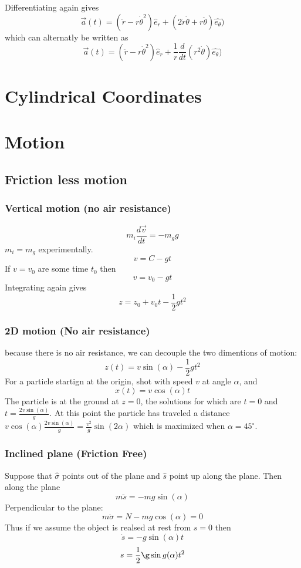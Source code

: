 \documentclass{homework}
\begin{document}
Differentiating again gives 
\[\vec{a}(t) = (\ddot{r} - r\dot{\theta}^2)\hat e_r + (2\dot{r}\dot{\theta} + r\ddot{\theta})\hat{e_{\theta}})\]
which can alternatly be written as
\[\vec{a}(t) = (\ddot{r} - r\dot{\theta}^2)\hat e_r + \frac{1}{r}\frac{d}{dt}(r^2\dot{\theta})\hat{e_{\theta}})\]


\section{Cylindrical Coordinates}

\section{Motion}

\subsection{Friction less motion}

\subsubsection{Vertical motion (no air resistance)}
\[m_i\frac{d\vec {v}}{dt} = -m_g g\]
$m_i = m_g$ experimentally.
\[v = C - gt\]
If $v = v_0$ are some time $t_0$ then
\[v = v_0 - gt\]
Integrating again gives
\[z = z_0 + v_0t - \frac{1}{2}gt^2\]



\subsubsection{2D motion (No air resistance)}

because there is no air resistance, we can decouple the two dimentions of motion:
\[z(t) = v\sin(\alpha)-\frac{1}{2}gt^2\]
For a particle startign at the origin, shot with speed $v$ at angle $\alpha$, and 
\[x(t) = v\cos (\alpha)t\]
The particle is at the ground at $z = 0$, the solutions for which are $t = 0$ and $t = \frac{2v\sin (\alpha )}{g}$. At this point the particle has traveled a distance $v\cos (\alpha ) \frac{2v\sin (\alpha )}{g} = \frac{v^2}{g}\sin (2 \alpha )$ which is maximized when $\alpha = 45^{\circ}$.


\subsubsection{Inclined plane (Friction Free)}

Suppose that $\hat\sigma$ points out of the plane and $\hat s$ point up along the plane. Then along the plane
\[m\ddot s = -mg\sin (\alpha)\]
Perpendicular to the plane:
\[m \ddot {\sigma} = N - mg \cos (\alpha) =0\]
Thus if we assume the object is realsed at rest from $s = 0$ then
\[\dot s = -g \sin (\alpha) t\]
\[s = \frac{1}{2}\g \sin g (\alpha)t^2\]
\end{document}
